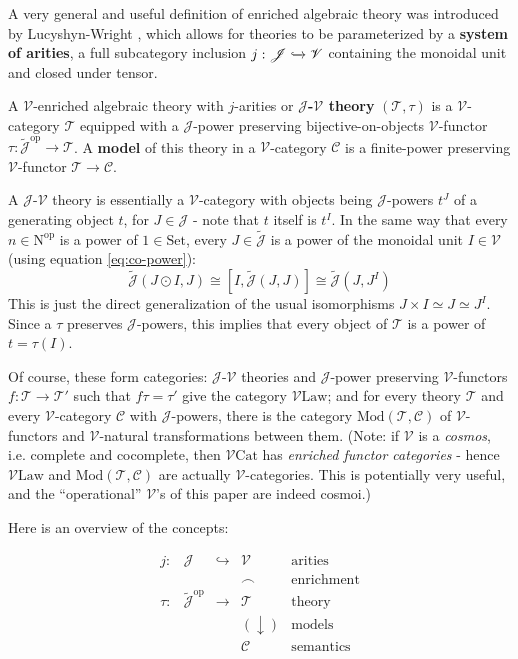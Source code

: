 \documentclass[a4paper,UKenglish]{article}
\theoremstyle{definition}
\newcommand{\Set}{\mathrm{Set}}
\newcommand{\Cat}{\mathrm{Cat}}
\newcommand{\Law}{\mathrm{Law}}
\newcommand{\Mod}{\mathrm{Mod}}
\newcommand{\op}{\mathrm{op}}
\newcommand{\NN}{\mathrm{N}}
\newcommand{\V}{\mathscr{V}}
\newcommand{\C}{\mathscr{C}}
\newcommand{\J}{\mathscr{J}}
\newcommand{\T}{\mathscr{T}}
\begin{document}
A very general and useful definition of enriched algebraic theory was introduced by Lucyshyn-Wright \cite{rbb}, which allows for theories to be parameterized by a \textbf{system of arities}, a full subcategory inclusion $j: \J \xhookrightarrow{} \V$ containing the monoidal unit and closed under tensor.

A $\V$-enriched algebraic theory with $j$-arities or \textbf{$\J$-$\V$ theory} $(\T,\tau)$ is a $\V$-category $\T$ equipped with a $\J$-power preserving bijective-on-objects $\V$-functor $\tau:\tilde{\J}^\op \to \T$. A \textbf{model} of this theory in a $\V$-category $\C$ is a finite-power preserving $\V$-functor $\T \to \C$.

A $\J$-$\V$ theory is essentially a $\V$-category with objects being $\J$-powers $t^J$ of a generating object $t$, for $J \in \J$ - note that $t$ itself is $t^I$. In the same way that every $n\in \NN^\op$ is a power of $1 \in \Set$, every $J\in \tilde{\J}$ is a power of the monoidal unit $I\in \V$ (using equation \ref{eq:co-power}): $$\tilde{\J}(J\odot I,J) \cong [I, \tilde{\J}(J,J)] \cong \tilde{\J}(J,J^I)$$ This is just the direct generalization of the usual isomorphisms $J \times I \simeq J \simeq J^I$. Since a $\tau$ preserves $\J$-powers, this implies that every object of $\T$ is a power of $t = \tau(I)$.

Of course, these form categories: $\J$-$\V$ theories and $\J$-power preserving $\V$-functors $f: \T \to \T'$ such that $f\tau = \tau'$ give the category $\V\Law$; and for every theory $\T$ and every $\V$-category $\C$ with $\J$-powers, there is the category $\Mod(\T,\C)$ of $\V$-functors and $\V$-natural transformations between them. (Note: if $\V$ is a \textit{cosmos}, i.e. complete and cocomplete, then $\V\Cat$ has \textit{enriched functor categories} - hence $\V\Law$ and $\Mod(\T,\C)$ are actually $\V$-categories. This is potentially very useful, and the ``operational'' $\V$'s of this paper are indeed cosmoi.)

Here is an overview of the concepts: 

\[\begin{array}{ccccl}
j: & \J & \hookrightarrow & \V & \text{arities}\\
& & & \frown & \text{enrichment}\\
\tau: & \tilde{\J}^\op & \to & \T & \text{theory}\\
& & & (\downarrow) & \text{models}\\
& & & \C & \text{semantics}\\
\end{array}\]
\end{document}
